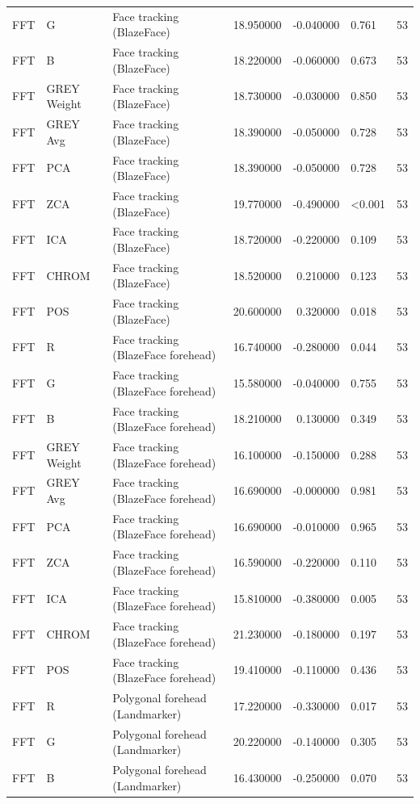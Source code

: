 \begin{table}[htbp]
\begin{tabular}{l l l r r l r}
FFT & G & Face tracking (BlazeFace) & 18.950000 & -0.040000 & 0.761 & 53 \\
FFT & B & Face tracking (BlazeFace) & 18.220000 & -0.060000 & 0.673 & 53 \\
FFT & GREY Weight & Face tracking (BlazeFace) & 18.730000 & -0.030000 & 0.850 & 53 \\
FFT & GREY Avg & Face tracking (BlazeFace) & 18.390000 & -0.050000 & 0.728 & 53 \\
FFT & PCA & Face tracking (BlazeFace) & 18.390000 & -0.050000 & 0.728 & 53 \\
FFT & ZCA & Face tracking (BlazeFace) & 19.770000 & -0.490000 & <0.001 & 53 \\
FFT & ICA & Face tracking (BlazeFace) & 18.720000 & -0.220000 & 0.109 & 53 \\
FFT & CHROM & Face tracking (BlazeFace) & 18.520000 & 0.210000 & 0.123 & 53 \\
FFT & POS & Face tracking (BlazeFace) & 20.600000 & 0.320000 & 0.018 & 53 \\
FFT & R & Face tracking (BlazeFace forehead) & 16.740000 & -0.280000 & 0.044 & 53 \\
FFT & G & Face tracking (BlazeFace forehead) & 15.580000 & -0.040000 & 0.755 & 53 \\
FFT & B & Face tracking (BlazeFace forehead) & 18.210000 & 0.130000 & 0.349 & 53 \\
FFT & GREY Weight & Face tracking (BlazeFace forehead) & 16.100000 & -0.150000 & 0.288 & 53 \\
FFT & GREY Avg & Face tracking (BlazeFace forehead) & 16.690000 & -0.000000 & 0.981 & 53 \\
FFT & PCA & Face tracking (BlazeFace forehead) & 16.690000 & -0.010000 & 0.965 & 53 \\
FFT & ZCA & Face tracking (BlazeFace forehead) & 16.590000 & -0.220000 & 0.110 & 53 \\
FFT & ICA & Face tracking (BlazeFace forehead) & 15.810000 & -0.380000 & 0.005 & 53 \\
FFT & CHROM & Face tracking (BlazeFace forehead) & 21.230000 & -0.180000 & 0.197 & 53 \\
FFT & POS & Face tracking (BlazeFace forehead) & 19.410000 & -0.110000 & 0.436 & 53 \\
FFT & R & Polygonal forehead (Landmarker) & 17.220000 & -0.330000 & 0.017 & 53 \\
FFT & G & Polygonal forehead (Landmarker) & 20.220000 & -0.140000 & 0.305 & 53 \\
FFT & B & Polygonal forehead (Landmarker) & 16.430000 & -0.250000 & 0.070 & 53 \\

\end{tabular}
\end{table}
